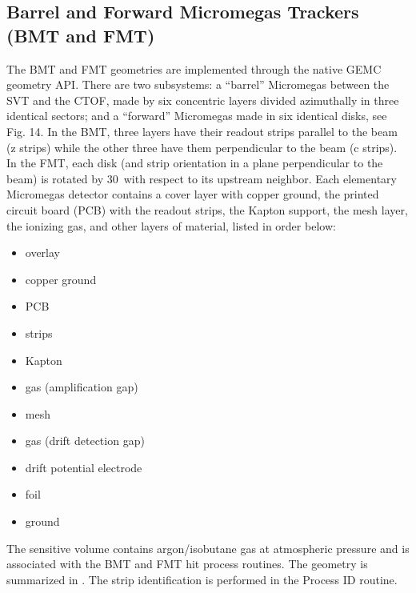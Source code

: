 \subsection{Barrel and Forward Micromegas Trackers (BMT and FMT)}

The BMT and FMT geometries are implemented through the native GEMC geometry API.
There are two subsystems: a ``barrel'' Micromegas between the SVT and the CTOF, made by six concentric layers
divided azimuthally in three identical sectors; and a ``forward'' Micromegas
made in six identical disks, see Fig. 14. In the BMT, three layers have their readout strips parallel
to the beam (z strips) while the other three have them perpendicular to the
beam (c strips). In the FMT, each disk (and strip orientation in a plane perpendicular to the beam)
is rotated by 30\mdeg\ with respect to its upstream neighbor. Each elementary Micromegas detector contains a
cover layer with copper ground, the printed circuit board (PCB) with the readout strips,
the Kapton support, the mesh layer, the ionizing gas, and other layers of material, listed in order below:

\begin{itemize}
	\item overlay
	\item copper ground
	\item PCB
	\item strips
	\item Kapton
	\item gas (amplification gap)
	\item mesh
	\item gas (drift detection gap)
	\item drift potential electrode
	\item foil
	\item ground
\end{itemize}

The sensitive volume contains argon/isobutane gas at atmospheric pressure and is associated with the BMT and
FMT hit process routines.
The geometry is summarized in . The strip identification is performed in the Process ID routine.

